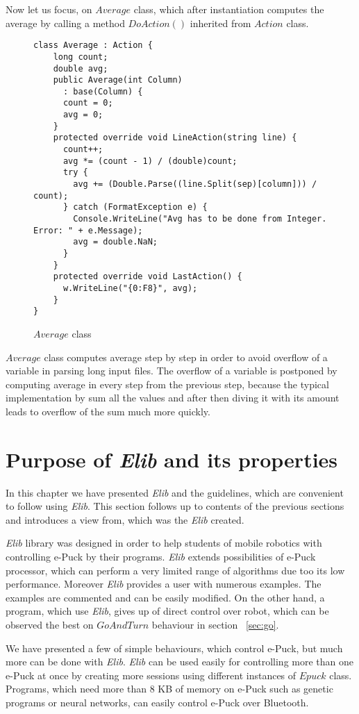 	Now let us focus, on $Average$ class, which after instantiation computes the average by calling a method $DoAction()$
	inherited from $Action$ class. 

\begin{figure}[!hbp]
\begin{lstlisting}
class Average : Action {
    long count;
    double avg;
    public Average(int Column)
      : base(Column) {
      count = 0;
      avg = 0;
    }
    protected override void LineAction(string line) {
      count++;
      avg *= (count - 1) / (double)count;
      try {
        avg += (Double.Parse((line.Split(sep)[column])) / count);
      } catch (FormatException e) {
        Console.WriteLine("Avg has to be done from Integer. Error: " + e.Message);
        avg = double.NaN;
      }
    }
    protected override void LastAction() {
      w.WriteLine("{0:F8}", avg);
    }
}
\end{lstlisting}
\caption{$Average$ class}\label{average}
\end{figure}

	$Average$ class computes average step by step in order to avoid 
	overflow of a variable in parsing long input files. The overflow
	of a variable is postponed by computing average in every step from the previous step, 
	because the typical implementation by sum all the values and after then diving it 
	with its amount leads to overflow of the sum much more quickly.

\section{Purpose of {\it Elib} and its properties}
	In this chapter we have presented {\it Elib} and the guidelines, which are convenient to follow using {\it Elib}. 
	This section follows up to contents of the previous sections and introduces a view from,
	which was the {\it Elib} created.

	{\it Elib} library was designed in order to help students of mobile robotics	with controlling e-Puck by their programs.
	{\it Elib} extends possibilities of e-Puck processor, which can perform a very limited range of algorithms
	due too its low performance.
	Moreover {\it Elib} provides a user with numerous examples. The examples are commented
	and can be easily modified.
	On the other hand, a program, which use {\it Elib}, gives up of direct control over robot,
	which can be observed the best on $GoAndTurn$ behaviour in section ~\ref{sec:go}.

	We have presented a few of simple behaviours, which control e-Puck, but much more can be done with {\it Elib}.
	{\it Elib} can be used easily for controlling more than one e-Puck at once by creating more sessions using
	different instances of $Epuck$ class. Programs, which need more than 8 KB of memory on e-Puck such 
	as genetic programs or neural networks, can easily control e-Puck over Bluetooth.

